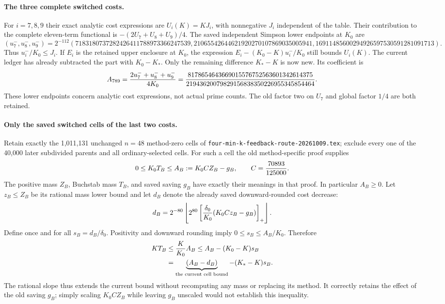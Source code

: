 \paragraph{The three complete switched costs.}
For $i=7,8,9$ their exact analytic cost expressions are $U_i(K)=KJ_i$,
with nonnegative $J_i$ independent of the table. Their contribution to
the complete eleven-term functional is $-(2U_7+U_8+U_9)/4$.
The saved independent Simpson lower endpoints at $K_0$ are
\[
 (u_7^-,u_8^-,u_9^-)=2^{-112}
 (7183180737282426411788973366247539,
 21065542644621920270107869035005941,
 16911485600294926597530591281091713).
\]
Thus $u_i^-/K_0\le J_i$. If $E_i$ is the retained upper enclosure at
$K_0$, the expression $E_i-(K_0-K)u_i^-/K_0$ still bounds $U_i(K)$.
The current ledger has already subtracted the part with $K_0-K_*$.
Only the remaining difference $K_*-K$ is now new. Its coefficient is
\[
 A_{789}={2u_7^-+u_8^-+u_9^-\over4K_0}
 ={8178654643669015576752563601342614375\over
    21943620079829156838350226955345854464}.
\]
These lower endpoints concern analytic cost expressions, not actual
prime counts. The old factor two on $U_7$ and global factor $1/4$ are
both retained.

\paragraph{Only the saved switched cells of the last two costs.}
Retain exactly the 1,011,131 unchanged $n=48$ method-zero cells of
\texttt{four-min-k-feedback-route-20261009.tex}; exclude every one of
the 40,000 later subdivided parents and all ordinary-selected cells.
For such a cell the old method-specific proof supplies
\[
 0\le K_0T_B\le A_B:=K_0CZ_B-g_B,\qquad C={70893\over125000}.
\]
The positive mass $Z_B$, Buchstab mass $T_B$, and saved saving $g_B$
have exactly their meanings in that proof. In particular $A_B\ge0$.
Let $z_B\le Z_B$ be its rational mass lower bound and let $d_B$ denote
the already saved downward-rounded cost decrease:
\[
 d_B=2^{-80}\left\lfloor 2^{80}
       \left[{\delta_0\over K_0}(K_0Cz_B-g_B)\right]_+\right\rfloor.
\]
Define once and for all $s_B=d_B/\delta_0$. Positivity and downward
rounding imply $0\le s_B\le A_B/K_0$. Therefore
\begin{align*}
 KT_B&\le {K\over K_0}A_B
 \le A_B-(K_0-K)s_B\\
 &=\underbrace{(A_B-d_B)}_{\text{the current cell bound}}
                    -(K_*-K)s_B.
\end{align*}
The rational slope thus extends the current bound without recomputing
any mass or replacing its method. It correctly retains the effect of
the old saving $g_B$; simply scaling $K_0CZ_B$ while leaving $g_B$
unscaled would not establish this inequality.

